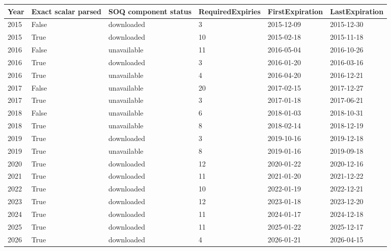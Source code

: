 \begin{tabular}{llllll}
\toprule
Year & Exact scalar parsed & SOQ component status & RequiredExpiries & FirstExpiration & LastExpiration \\
\midrule
2015 & False & downloaded & 3 & 2015-12-09 & 2015-12-30 \\
2015 & True & downloaded & 10 & 2015-02-18 & 2015-11-18 \\
2016 & False & unavailable & 11 & 2016-05-04 & 2016-10-26 \\
2016 & True & downloaded & 3 & 2016-01-20 & 2016-03-16 \\
2016 & True & unavailable & 4 & 2016-04-20 & 2016-12-21 \\
2017 & False & unavailable & 20 & 2017-02-15 & 2017-12-27 \\
2017 & True & unavailable & 3 & 2017-01-18 & 2017-06-21 \\
2018 & False & unavailable & 6 & 2018-01-03 & 2018-10-31 \\
2018 & True & unavailable & 8 & 2018-02-14 & 2018-12-19 \\
2019 & True & downloaded & 3 & 2019-10-16 & 2019-12-18 \\
2019 & True & unavailable & 8 & 2019-01-16 & 2019-09-18 \\
2020 & True & downloaded & 12 & 2020-01-22 & 2020-12-16 \\
2021 & True & downloaded & 11 & 2021-01-20 & 2021-12-22 \\
2022 & True & downloaded & 10 & 2022-01-19 & 2022-12-21 \\
2023 & True & downloaded & 12 & 2023-01-18 & 2023-12-20 \\
2024 & True & downloaded & 11 & 2024-01-17 & 2024-12-18 \\
2025 & True & downloaded & 11 & 2025-01-22 & 2025-12-17 \\
2026 & True & downloaded & 4 & 2026-01-21 & 2026-04-15 \\
\bottomrule
\end{tabular}
